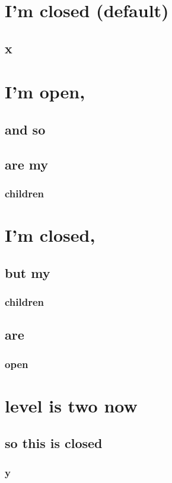 \documentclass{article}
\begin{document}
\section{I'm closed (default)}
\subsection{x}

\hypersetup{bookmarksopen=true}

\section{I'm open,}
\subsection{and so}
\subsection{are my}
\subsubsection{children}

\hypersetup{bookmarksopen=false}

\section{I'm closed,}

\hypersetup{bookmarksopen=true}

\subsection{but my}
\subsubsection{children}
\subsection{are}
\subsubsection{open}

\hypersetup{bookmarksopenlevel=2}

\section{level is two now}
\subsection{so this is closed}
\subsubsection{y}
\end{document}
